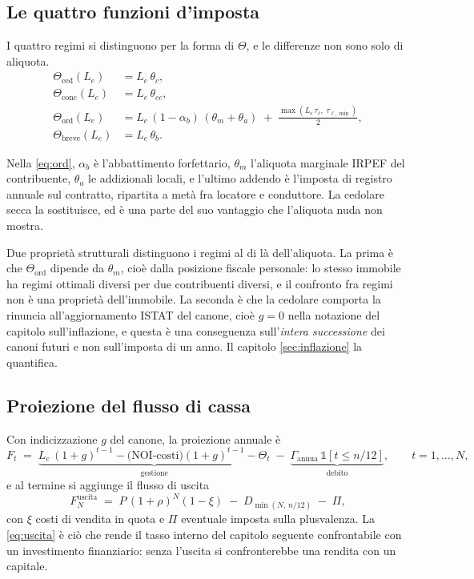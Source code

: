 \documentclass[11pt,a4paper]{article}
\theoremstyle{definition}
\theoremstyle{plain}
\begin{document}
\subsection{Le quattro funzioni d'imposta}

I quattro regimi si distinguono per la forma di $\Theta$, e le differenze non sono solo di aliquota.
\begin{align}
\Theta_{\text{ced}}(L_e) &= L_e\,\theta_c, \label{eq:ced}\\
\Theta_{\text{conc}}(L_e) &= L_e\,\theta_{cc}, \label{eq:conc}\\
\Theta_{\text{ord}}(L_e) &= L_e\,(1-\alpha_b)\,(\theta_m + \theta_a) \;+\; \frac{\max(L_e\,\tau_\ell,\;\tau_{\ell,\min})}{2}, \label{eq:ord}\\
\Theta_{\text{breve}}(L_e) &= L_e\,\theta_b. \label{eq:breve}
\end{align}

Nella \eqref{eq:ord}, $\alpha_b$ è l'abbattimento forfettario, $\theta_m$ l'aliquota marginale IRPEF del contribuente, $\theta_a$ le addizionali locali, e l'ultimo addendo è l'imposta di registro annuale sul contratto, ripartita a metà fra locatore e conduttore. La cedolare secca la sostituisce, ed è una parte del suo vantaggio che l'aliquota nuda non mostra.

Due proprietà strutturali distinguono i regimi al di là dell'aliquota. La prima è che $\Theta_{\text{ord}}$ dipende da $\theta_m$, cioè dalla posizione fiscale personale: lo stesso immobile ha regimi ottimali diversi per due contribuenti diversi, e il confronto fra regimi non è una proprietà dell'immobile. La seconda è che la cedolare comporta la rinuncia all'aggiornamento ISTAT del canone, cioè $g=0$ nella notazione del capitolo sull'inflazione, e questa è una conseguenza sull'\emph{intera successione} dei canoni futuri e non sull'imposta di un anno. Il capitolo \ref{sec:inflazione} la quantifica.

\subsection{Proiezione del flusso di cassa}

Con indicizzazione $g$ del canone, la proiezione annuale è
\begin{equation}
F_t \;=\; \underbrace{L_e\,(1+g)^{t-1} - \big(\mathrm{NOI}\text{-costi}\big)(1+g)^{t-1} - \Theta_t}_{\text{gestione}} \;-\; \underbrace{\Gamma_{\text{annua}}\,\mathbb{1}[t\le n/12]}_{\text{debito}},
\qquad t=1,\dots,N,
\label{eq:proiezione}
\end{equation}
e al termine si aggiunge il flusso di uscita
\begin{equation}
F_N^{\text{uscita}} \;=\; P\,(1+\rho)^N (1-\xi) \;-\; D_{\min(N,\,n/12)} \;-\; \Pi,
\label{eq:uscita}
\end{equation}
con $\xi$ costi di vendita in quota e $\Pi$ eventuale imposta sulla plusvalenza. La \eqref{eq:uscita} è ciò che rende il tasso interno del capitolo seguente confrontabile con un investimento finanziario: senza l'uscita si confronterebbe una rendita con un capitale.
\end{document}
